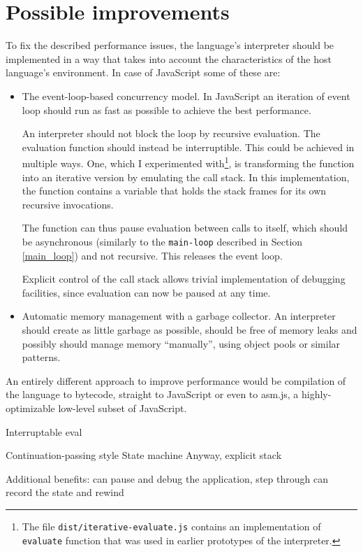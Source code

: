 \section{Possible improvements}
To fix the described performance issues, the language's interpreter should be implemented in a way that takes into account the characteristics of the host language's environment. In case of JavaScript some of these are:
\begin{itemize}
\item The event-loop-based concurrency model. In JavaScript an iteration of event loop should run as fast as possible to achieve the best performance. 

An interpreter should not block the loop by recursive evaluation. The evaluation function should instead be interruptible. This could be achieved in multiple ways. One, which I experimented with\footnote{The file \texttt{dist/iterative-evaluate.js} contains an implementation of \texttt{evaluate} function that was used in earlier prototypes of the interpreter.}, is transforming the function into an iterative version by emulating the call stack. In this implementation, the function contains a variable that holds the stack frames for its own recursive invocations.

The function can thus pause evaluation between calls to itself, which should be asynchronous (similarly to the \texttt{main-loop} described in Section \ref{main_loop}) and not recursive. This releases the event loop.

Explicit control of the call stack allows trivial implementation of debugging facilities, since evaluation can now be paused at any time.

\item Automatic memory management with a garbage collector. An interpreter should create as little garbage as possible, should be free of memory leaks and possibly should manage memory ``manually'', using object pools or similar patterns.
\end{itemize}

An entirely different approach to improve performance would be compilation of the language to bytecode, straight to JavaScript or even to asm.js, a highly-optimizable low-level subset of JavaScript\cite{asmjs_spec}. 

Interruptable eval

Continuation-passing style State machine Anyway, explicit stack

Additional benefits: can pause and debug the application, step through can
record the state and rewind

